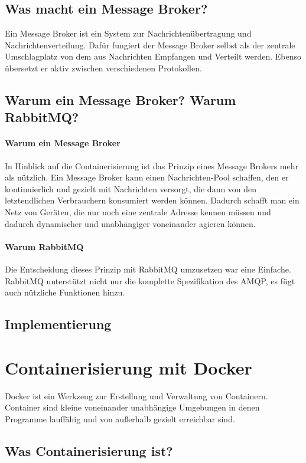 \documentclass[12pt,a4paper]{article}
\begin{document}
\subsection{Was macht ein Message Broker?}
Ein Message Broker ist ein System zur Nachrichtenübertragung und Nachrichtenverteilung. Dafür fungiert der Message Broker selbst als der zentrale Umschlagplatz von dem aus Nachrichten Empfangen und Verteilt werden. Ebenso übersetzt er aktiv zwischen verschiedenen Protokollen\cite{mesBro}. 

\subsection{Warum ein Message Broker? Warum RabbitMQ?}
\paragraph{Warum ein Message Broker}
In Hinblick auf die Containerisierung ist das Prinzip eines Message Brokers mehr als nützlich.
Ein Message Broker kann einen Nachrichten-Pool schaffen, den er kontinuierlich und gezielt mit Nachrichten versorgt, die dann von den letztendlichen Verbrauchern konsumiert werden können. Dadurch schafft man ein Netz von Geräten, die nur noch eine zentrale Adresse kennen müssen und dadurch dynamischer und unabhängiger voneinander agieren können. 

\paragraph{Warum RabbitMQ}
Die Entscheidung dieses Prinzip mit \gls{RabbitMQ} umzusetzen war eine Einfache. \gls{RabbitMQ} unterstützt nicht nur die komplette Spezifikation des \gls{AMQP}, es fügt auch nützliche Funktionen hinzu\cite{rabExt}.

\subsection{Implementierung}

\section{Containerisierung mit \gls{Docker}} \label{docker}
Docker ist ein Werkzeug zur Erstellung und Verwaltung von Containern. Container sind kleine voneinander unabhängige Umgebungen in denen Programme lauffähig und von außerhalb gezielt erreichbar sind.

\subsection{Was Containerisierung ist?}
\end{document}
